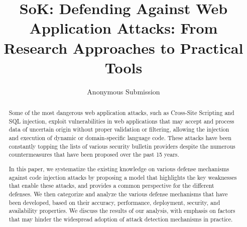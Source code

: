 \documentclass[conference]{IEEEtran}
\date{}
\begin{document}

\author{Anonymous Submission}

\title{SoK: Defending Against Web Application Attacks: From Research
  Approaches to Practical Tools}

\maketitle
\thispagestyle{plain}
\pagestyle{plain}
\begin{abstract}

  Some of the most dangerous web application attacks, such as Cross-Site
  Scripting and SQL injection, exploit vulnerabilities
  in web applications that may accept and process
  data of uncertain origin without proper validation or
  filtering, allowing the injection and execution of
  dynamic or domain-specific language code.
  These attacks have been constantly topping the lists of
  various security bulletin providers despite the numerous
  countermeasures that have been proposed over the past 15 years.

  In this paper, we systematize the existing knowledge on
  various defense mechanisms against code injection attacks by proposing
  a model that highlights the key weaknesses that enable these attacks,
  and provides a common perspective for the different defenses.
  We then categorize and analyze the various defense mechanisms that
  have been developed, based on their accuracy, performance,
  deployment, security, and availability properties.
  We discuss the results of our analysis, with emphasis on factors
  that may hinder the widespread adoption of attack detection
  mechanisms in practice.

\end{abstract}
\end{document}
